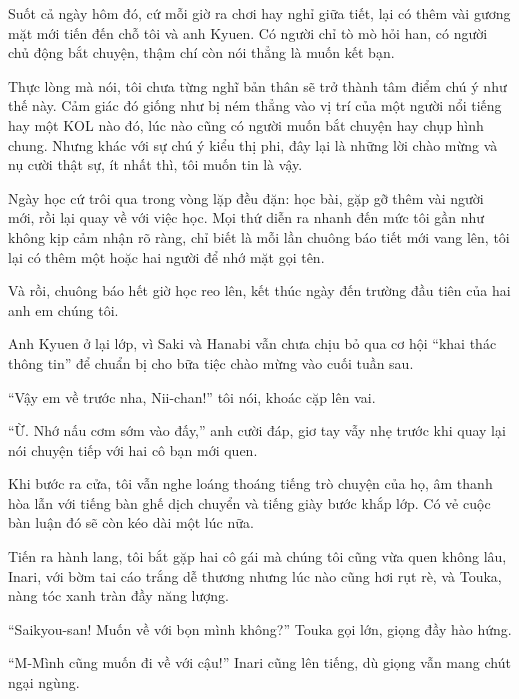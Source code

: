 \documentclass[../main.tex]{subfiles}
\begin{document}


Suốt cả ngày hôm đó, cứ mỗi giờ ra chơi hay nghỉ giữa tiết, lại có thêm vài gương mặt mới tiến đến chỗ tôi và anh Kyuen. Có người chỉ tò mò hỏi han, có người chủ động bắt chuyện, thậm chí còn nói thẳng là muốn kết bạn.

Thực lòng mà nói, tôi chưa từng nghĩ bản thân sẽ trở thành tâm điểm chú ý như thế này. Cảm giác đó giống như bị ném thẳng vào vị trí của một người nổi tiếng hay một KOL nào đó, lúc nào cũng có người muốn bắt chuyện hay chụp hình chung. Nhưng khác với sự chú ý kiểu thị phi, đây lại là những lời chào mừng và nụ cười thật sự, ít nhất thì, tôi muốn tin là vậy.

Ngày học cứ trôi qua trong vòng lặp đều đặn: học bài, gặp gỡ thêm vài người mới, rồi lại quay về với việc học. Mọi thứ diễn ra nhanh đến mức tôi gần như không kịp cảm nhận rõ ràng, chỉ biết là mỗi lần chuông báo tiết mới vang lên, tôi lại có thêm một hoặc hai người để nhớ mặt gọi tên.

Và rồi, chuông báo hết giờ học reo lên, kết thúc ngày đến trường đầu tiên của hai anh em chúng tôi.

Anh Kyuen ở lại lớp, vì Saki và Hanabi vẫn chưa chịu bỏ qua cơ hội ``khai thác thông tin'' để chuẩn bị cho bữa tiệc chào mừng vào cuối tuần sau.

``Vậy em về trước nha, Nii-chan!'' tôi nói, khoác cặp lên vai.

``Ừ. Nhớ nấu cơm sớm vào đấy,'' anh cười đáp, giơ tay vẫy nhẹ trước khi quay lại nói chuyện tiếp với hai cô bạn mới quen.

Khi bước ra cửa, tôi vẫn nghe loáng thoáng tiếng trò chuyện của họ, âm thanh hòa lẫn với tiếng bàn ghế dịch chuyển và tiếng giày bước khắp lớp. Có vẻ cuộc bàn luận đó sẽ còn kéo dài một lúc nữa.

Tiến ra hành lang, tôi bắt gặp hai cô gái mà chúng tôi cũng vừa quen không lâu, Inari, với bờm tai cáo trắng dễ thương nhưng lúc nào cũng hơi rụt rè, và Touka, nàng tóc xanh tràn đầy năng lượng.

``Saikyou-san! Muốn về với bọn mình không?'' Touka gọi lớn, giọng đầy hào hứng.

``M-Mình cũng muốn đi về với cậu!'' Inari cũng lên tiếng, dù giọng vẫn mang chút ngại ngùng.
\end{document}
